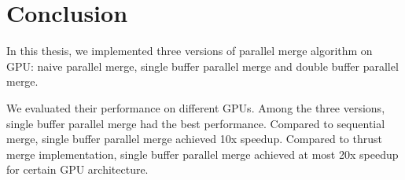 \chapter{Conclusion}\label{chap:conclusion}
In this thesis, we implemented three versions of parallel merge algorithm on GPU: 
naive parallel merge, single buffer parallel merge and double buffer parallel merge.

We evaluated their performance on different GPUs. Among the three versions, single 
buffer parallel merge had the best performance. Compared to sequential merge,
single buffer parallel merge achieved 10x speedup. Compared to thrust merge 
implementation, single buffer parallel merge achieved at most 20x speedup 
for certain GPU architecture.

